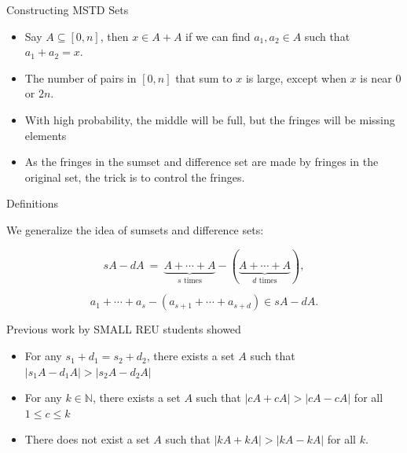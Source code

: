 \documentclass[11pt]{beamer}
\newcommand{\N}{\mathbb{N}}
\begin{document}
\begin{frame}{Constructing MSTD Sets}
\begin{itemize}
\item Say $A\subseteq [0,n]$, then $x\in A+A$ if we can find $a_1,a_2\in A$ such that $a_1+a_2=x.$

\pause
\bigskip

\item The number of pairs in $[0,n]$ that sum to $x$ is large, except when $x$ is near $0$ or $2n$. 

\pause
\bigskip

\item With high probability, the middle will be full, but the fringes will be missing elements

\pause
\bigskip

\item As the fringes in the sumset and difference set are made by fringes in the original set, the trick is to control the fringes.
\end{itemize}

\end{frame}


\begin{frame}{Definitions}

We generalize the idea of sumsets and difference sets: \pause

$$sA-dA \ = \ \underbrace{A+\cdots+A}_{\text{$s$ times}}- (\underbrace{A+\cdots+A}_{\text{$d$ times}}),  $$

$$a_1+\cdots + a_s - (a_{s+1}+\cdots +a_{s+d}) \in sA-dA.$$
\pause

Previous work by SMALL REU students showed \pause
\begin{itemize}
    \item For any $s_1+d_1=s_2+d_2$, there exists a set $A$ such that $|s_1A-d_1A|>|s_2A-d_2A|$
    
    \pause
    \medskip
    
    \item  For any $k \in \N$, there exists a set $A$ such that $|cA+cA|>|cA-cA|$ for all $1\leq c \leq k$
    
    \pause
    \medskip
    
    \item There does not exist a  set $A$ such that $|kA+kA|>|kA-kA|$ for all $k$.
\end{itemize}

\end{frame}
\end{document}
